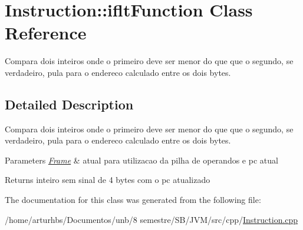 \hypertarget{classInstruction_1_1ifltFunction}{}\section{Instruction\+:\+:iflt\+Function Class Reference}
\label{classInstruction_1_1ifltFunction}


Compara dois inteiros onde o primeiro deve ser menor do que que o segundo, se verdadeiro, pula para o endereco calculado entre os dois bytes.  




\subsection{Detailed Description}
Compara dois inteiros onde o primeiro deve ser menor do que que o segundo, se verdadeiro, pula para o endereco calculado entre os dois bytes. 


\begin{DoxyParams}{Parameters}
{\em \hyperlink{classFrame}{Frame}} & atual para utilizacao da pilha de operandos e pc atual \\
\hline
\end{DoxyParams}
\begin{DoxyReturn}{Returns}
inteiro sem sinal de 4 bytes com o pc atualizado 
\end{DoxyReturn}


The documentation for this class was generated from the following file\+:\begin{DoxyCompactItemize}
\item 
/home/arturhbs/\+Documentos/unb/8 semestre/\+S\+B/\+J\+V\+M/src/cpp/\hyperlink{Instruction_8cpp}{Instruction.\+cpp}\end{DoxyCompactItemize}
